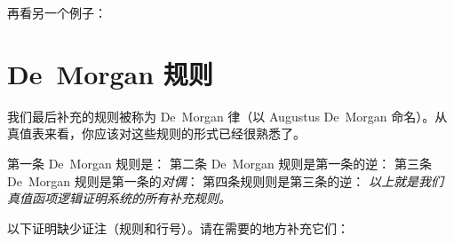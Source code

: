 再看另一个例子：


\begin{fitchproof}
	\PR
	\open
		\AS
	\close
	\open
		\AS
	\close
\end{fitchproof}

\section{De~Morgan 规则}
我们最后补充的规则被称为 De~Morgan 律（以 Augustus De~Morgan 命名）。从真值表来看，你应该对这些规则的形式已经很熟悉了。

第一条 De~Morgan 规则是：
第二条 De~Morgan 规则是第一条的逆：
第三条 De~Morgan 规则是第一条的\emph{对偶}：
第四条规则则是第三条的逆：
\emph{以上就是我们真值函项逻辑证明系统的所有补充规则。}

\practiceproblems
\solutions
\problempart
\label{pr.justifyTFLproof}
以下证明缺少证注（规则和行号）。请在需要的地方补充它们：


